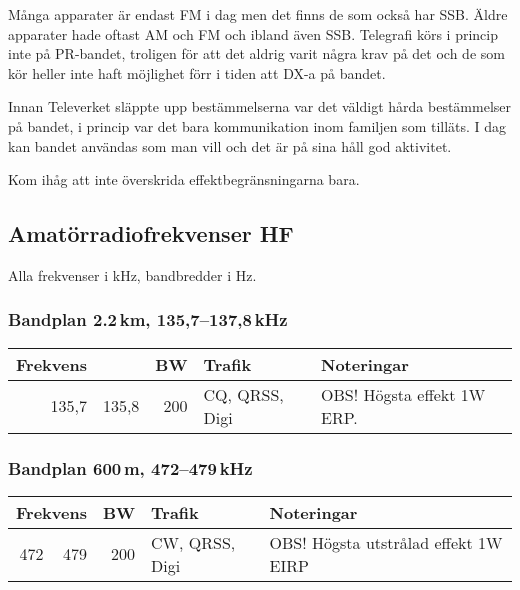 Många apparater är endast FM i dag men det finns de som också har SSB. Äldre
apparater hade oftast AM och FM och ibland även SSB. Telegrafi körs i princip
inte på PR-bandet, troligen för att det aldrig varit några krav på det och de
som kör heller inte haft möjlighet förr i tiden att DX-a på bandet.

Innan Televerket släppte upp bestämmelserna var det väldigt hårda bestämmelser
på bandet, i princip var det bara kommunikation inom familjen som tilläts. I dag
kan bandet användas som man vill och det är på sina håll god aktivitet.

Kom ihåg att inte överskrida effektbegränsningarna bara.

\subsection{Amatörradiofrekvenser HF}

Alla frekvenser i kHz, bandbredder i Hz.

\subsubsection{Bandplan 2.2\,km, 135,7--137,8\,kHz}

\begin{tabular}{rrrll}
\textbf{Frekvens} &  & \textbf{BW} & \textbf{Trafik} & \textbf{Noteringar} \\ \hline
135,7 & 135,8 & 200 & CQ, QRSS, Digi & OBS! Högsta effekt 1W ERP. \\ \hline
\end{tabular}

\subsubsection{Bandplan 600\,m, 472--479\,kHz}
\begin{tabular}{rrrll}
\multicolumn{2}{c}{\textbf{Frekvens}} & \textbf{BW} & \textbf{Trafik} & \textbf{Noteringar} \\ \hline
472 & 479 & 200 & CW, QRSS, Digi & OBS! Högsta utstrålad effekt 1W EIRP \\ \hline
\end{tabular}

